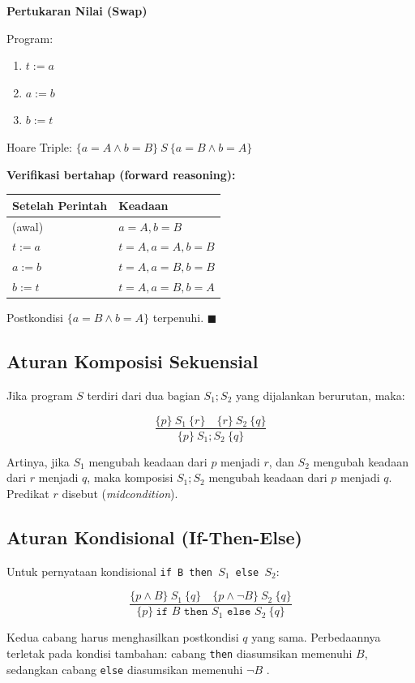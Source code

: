 \begin{contoh}
\textbf{Pertukaran Nilai (Swap)}

Program:
\begin{enumerate}
    \item $t := a$
    \item $a := b$
    \item $b := t$
\end{enumerate}

Hoare Triple: $\{a = A \wedge b = B\}\ S\ \{a = B \wedge b = A\}$

\textbf{Verifikasi bertahap (forward reasoning):}
\begin{center}
\renewcommand{\arraystretch}{1.2}
\begin{tabular}{|l|l|}
\hline
\textbf{Setelah Perintah} & \textbf{Keadaan} \\ \hline
(awal) & $a = A, b = B$ \\ \hline
$t := a$ & $t = A, a = A, b = B$ \\ \hline
$a := b$ & $t = A, a = B, b = B$ \\ \hline
$b := t$ & $t = A, a = B, b = A$ \\ \hline
\end{tabular}
\end{center}

Postkondisi $\{a = B \wedge b = A\}$ terpenuhi. $\blacksquare$
\end{contoh}

\subsection{Aturan Komposisi Sekuensial}

Jika program $S$ terdiri dari dua bagian $S_1; S_2$ yang dijalankan berurutan, maka:

\[ \frac{\{p\}\ S_1\ \{r\} \quad \{r\}\ S_2\ \{q\}}{\{p\}\ S_1; S_2\ \{q\}} \]

Artinya, jika $S_1$ mengubah keadaan dari $p$ menjadi $r$, dan $S_2$ mengubah keadaan dari $r$ menjadi $q$, maka komposisi $S_1; S_2$ mengubah keadaan dari $p$ menjadi $q$. Predikat $r$ disebut  (\textit{midcondition}).

\subsection{Aturan Kondisional (If-Then-Else)}

Untuk pernyataan kondisional \texttt{if B then $S_1$ else $S_2$}:

\[ \frac{\{p \wedge B\}\ S_1\ \{q\} \quad \{p \wedge \neg B\}\ S_2\ \{q\}}{\{p\}\ \texttt{if } B \texttt{ then } S_1 \texttt{ else } S_2\ \{q\}} \]

Kedua cabang harus menghasilkan postkondisi $q$ yang sama. Perbedaannya terletak pada kondisi tambahan: cabang \texttt{then} diasumsikan memenuhi $B$, sedangkan cabang \texttt{else} diasumsikan memenuhi $\neg B$ \cite{wiki_hoare_logic}.
